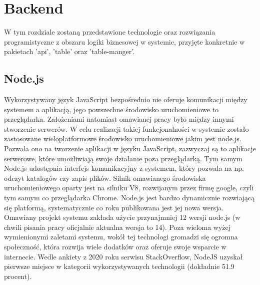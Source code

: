 \chapter{Backend}
\label{ch:backend}
W tym rozdziale zostaną przedstawione technologie oraz rozwiązania programistyczne z obszaru logiki biznesowej w systemie, przyjęte konkretnie w pakietach 'api', 'table' oraz 'table-manger'.

\label{section:node}
\section{Node.js}

Wykorzystywany język JavaScript bezpośrednio nie oferuje komunikacji między systemem a aplikacją, jego powszechne środowisko uruchomieniowe to przeglądarka. Założeniami natomiast omawianej pracy było między innymi stworzenie serwerów. W celu realizacji takiej funkcjonalności w systemie zostało zastosowane wieloplatformowe środowisko uruchomieniowe jakim jest node.js. Pozwala ono na tworzenie aplikacji w języku JavaScript, zazwyczaj są to aplikacje serwerowe, które umożliwiają swoje działanie poza przeglądarką. Tym samym Node.js udostępnia interfejs komunikacyjny z systemem, który pozwala na np. odczyt katalogów czy  zapis plików. Silnik omawianego środowiska uruchomieniowego oparty jest na silniku V8, rozwijanym przez firmę google, czyli tym samym co przeglądarka Chrome. Node.js jest bardzo dynamicznie rozwiającą się platformą, systematycznie co roku publikowana jest jej nowa wersja. Omawiany projekt systemu zakłada użycie przynajmniej 12 wersji node.js (w chwili pisania pracy oficjalnie aktualna wersja to 14). Poza wieloma wyżej wymienionymi zaletami systemu, wokół tej technologi gromadzi się ogromna społeczność, która rozwija wiele dodatków oraz oferuje swoje wsparcie w internecie. Wedle ankiety z 2020 roku serwisu StackOverflow, NodeJS uzyskał pierwsze miejsce w kategorii wykorzystywanych technologii (dokładnie 51.9 procent). \cite{StackOverflowSurvey, ExpressDocs}

